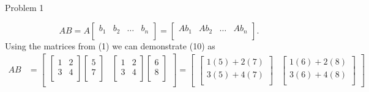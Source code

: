 \begin{problem}{Problem 1}
\begin{Highlight}[Solution]
        \begin{equation}
            AB = A 
            \begin{bmatrix}
                b_{1} & b_{2} & \dots & b_{n} \\
            \end{bmatrix}
            = 
            \begin{bmatrix}
                Ab_{1} & Ab_{2} & \dots & Ab_{n} \\
            \end{bmatrix}.
        \end{equation}
        Using the matrices from (1) we can demonstrate (10) as 
        \begin{align*}
            AB & =
            \begin{bmatrix}
                \begin{bmatrix}
                    1 & 2 \\
                    3 & 4 \\
                \end{bmatrix}
                \begin{bmatrix}
                    5 \\
                    7 \\
                \end{bmatrix} & 
                \begin{bmatrix}
                    1 & 2 \\
                    3 & 4 \\
                \end{bmatrix}
                \begin{bmatrix}
                    6 \\
                    8 \\
                \end{bmatrix} \\
            \end{bmatrix}
            = 
            \begin{bmatrix}
                \begin{bmatrix}
                    1(5) + 2(7) \\
                    3(5) + 4(7) \\
                \end{bmatrix} &
                \begin{bmatrix}
                    1(6) + 2(8) \\
                    3(6) + 4(8) \\

\end{bmatrix}
\end{bmatrix}
\end{align*}
\end{Highlight}
\end{problem}
